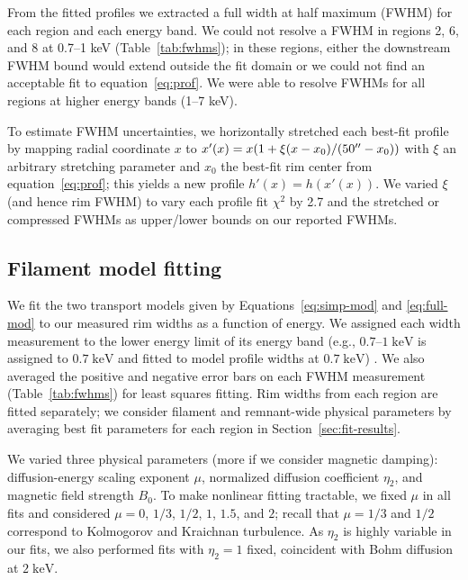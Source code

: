 \documentclass[iop, apj, numberedappendix, twocolappendix]{emulateapj}
\newcommand*{\mt}{\mathrm}
\newcommand*{\unit}[1]{\;\mt{#1}}  %
\begin{document}
From the fitted profiles we extracted a full width at half maximum (FWHM) for
each region and each energy band.  We could not resolve a FWHM in regions 2, 6,
and 8 at 0.7--1 keV (Table~\ref{tab:fwhms}); in these regions, either
the downstream FWHM bound would extend outside the fit domain or we could not
find an acceptable fit to equation~\eqref{eq:prof}.  We were able to resolve
FWHMs for all regions at higher energy bands (1--7 keV).

To estimate FWHM uncertainties, we horizontally stretched each best-fit
profile by mapping radial coordinate $x$ to
$x'(x) = x (1 + \xi (x-x_0)/(50\mbox{$^{\prime\prime}$}-x_0))$ with $\xi$ an arbitrary stretching
parameter and $x_0$ the best-fit rim center from equation~\eqref{eq:prof};
this yields a new profile $h'(x) = h(x'(x))$.
We varied $\xi$ (and hence rim FWHM) to vary each profile fit $\chi^2$ by 2.7
and the stretched or compressed FWHMs as upper/lower bounds on our reported
FWHMs. 


\subsection{Filament model fitting}
\label{sec:fits}

We fit the two transport models given by Equations~\eqref{eq:simp-mod} and
\eqref{eq:full-mod} to our measured rim widths as a function of energy.
We assigned each width measurement to the lower energy limit of its energy band
(e.g., $0.7$--$1 \unit{keV}$ is assigned to $0.7 \unit{keV}$ and fitted to
model profile widths at $0.7 \unit{keV}$) .
We also averaged the positive and negative error bars on each FWHM measurement
(Table~\ref{tab:fwhms}) for least squares fitting.
Rim widths from each region are fitted separately; we consider filament and
remnant-wide physical parameters by averaging best fit parameters for each
region in Section~\ref{sec:fit-results}.

We varied three physical parameters (more if we consider magnetic damping):
diffusion-energy scaling exponent $\mu$, normalized diffusion
coefficient $\eta_2$, and magnetic field strength $B_0$.
To make nonlinear fitting tractable, we fixed $\mu$ in all fits and considered
$\mu = 0$, $1/3$, $1/2$, $1$, $1.5$, and $2$;
recall that $\mu = 1/3$ and $1/2$ correspond to Kolmogorov and Kraichnan turbulence.
As $\eta_2$ is highly variable in our fits, we also performed
fits with $\eta_2 = 1$ fixed, coincident with Bohm diffusion at $2 \unit{keV}$.
\end{document}
